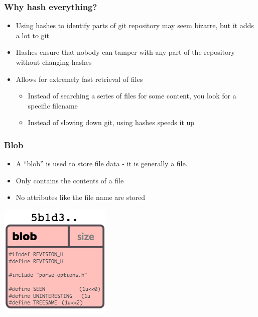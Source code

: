 \documentclass{beamer}
\begin{document}
\begin{frame}
  \frametitle{Why hash everything?}
  \begin{itemize}
    \item Using hashes to identify parts of git repository may seem bizarre, but it adds a lot to git
    \item Hashes ensure that nobody can tamper with any part of the repository without changing hashes
    \item Allows for extremely fast retrieval of files
      \begin{itemize}
	\item Instead of searching a series of files for some content, you look for a specific filename
	\item Instead of slowing down git, using hashes speeds it up
      \end{itemize}
  \end{itemize}
\end{frame}

\begin{frame}
  \frametitle{Blob}
  \begin{itemize}
    \item A ``blob'' is used to store file data - it is generally a file.
    \item Only contains the contents of a file 
    \item No attributes like the file name are stored
  \end{itemize}
  \includegraphics[scale = .7]{images/object-blob.png}
\end{frame}
\end{document}
